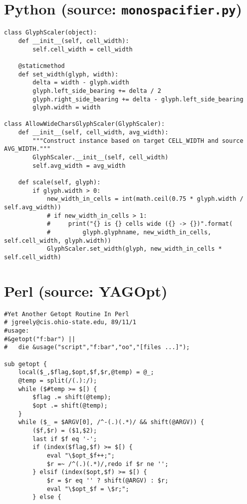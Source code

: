 \documentclass{article}
\begin{document}
\section*{Python (source: \texttt{monospacifier.py})}

\begin{verbatim}
class GlyphScaler(object):
    def __init__(self, cell_width):
        self.cell_width = cell_width

    @staticmethod
    def set_width(glyph, width):
        delta = width - glyph.width
        glyph.left_side_bearing += delta / 2
        glyph.right_side_bearing += delta - glyph.left_side_bearing
        glyph.width = width

class AllowWideCharsGlyphScaler(GlyphScaler):
    def __init__(self, cell_width, avg_width):
        """Construct instance based on target CELL_WIDTH and source AVG_WIDTH."""
        GlyphScaler.__init__(self, cell_width)
        self.avg_width = avg_width

    def scale(self, glyph):
        if glyph.width > 0:
            new_width_in_cells = int(math.ceil(0.75 * glyph.width / self.avg_width))
            # if new_width_in_cells > 1:
            #     print("{} is {} cells wide ({} -> {})".format(
            #         glyph.glyphname, new_width_in_cells, self.cell_width, glyph.width))
            GlyphScaler.set_width(glyph, new_width_in_cells * self.cell_width)
\end{verbatim}

\section*{Perl (source: YAGOpt)}

\begin{verbatim}
#Yet Another Getopt Routine In Perl
# jgreely@cis.ohio-state.edu, 89/11/1
#usage:
#&getopt("f:bar") ||
#	die &usage("script","f:bar","oo","[files ...]");

sub getopt {
    local($_,$flag,$opt,$f,$r,@temp) = @_;
    @temp = split(/(.):/);
    while ($#temp >= $[) {
        $flag .= shift(@temp);
        $opt .= shift(@temp);
    }
    while ($_ = $ARGV[0], /^-(.)(.*)/ && shift(@ARGV)) {
        ($f,$r) = ($1,$2);
        last if $f eq '-';
        if (index($flag,$f) >= $[) {
            eval "\$opt_$f++;";
            $r =~ /^(.)(.*)/,redo if $r ne '';
        } elsif (index($opt,$f) >= $[) {
            $r = $r eq '' ? shift(@ARGV) : $r;
            eval "\$opt_$f = \$r;";
        } else {
\end{verbatim}
\end{document}
